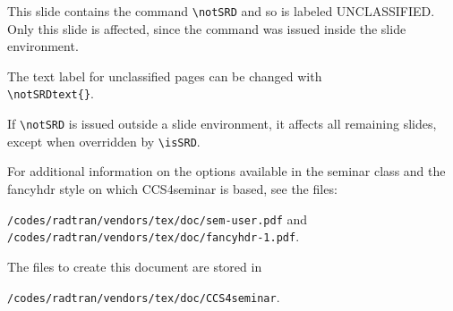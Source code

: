 \documentclass[SRD,
               slidesonly,
                notes
              ]{CCS4seminar}
\begin{document}
\begin{slide} \notSRD
  This slide contains the command \verb=\notSRD= and so is labeled
  UNCLASSIFIED. Only this slide is affected, since the command was
  issued inside the slide environment.
  
  The text label for unclassified pages can be changed with \\
  \verb=\notSRDtext{}=.
  
  If \verb=\notSRD= is issued outside a slide environment, it affects
  all remaining slides, except when overridden by \verb=\isSRD=.

\end{slide}

\begin{slide}


  For additional information on the options available in the seminar
  class and the fancyhdr style on which CCS4seminar is based, see the
  files: 

  {\tt /codes/radtran/vendors/tex/doc/sem-user.pdf} and
  {\tt /codes/radtran/vendors/tex/doc/fancyhdr-1.pdf}.

  The files to create this document are stored in

  {\tt /codes/radtran/vendors/tex/doc/CCS4seminar}.

 \end{slide}
   
\end{document}
